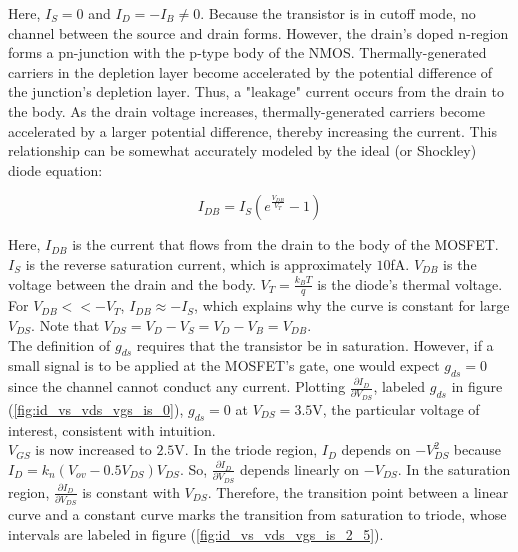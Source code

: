 \FloatBarrier

Here, $I_{S} = 0$ and $I_{D} = -I_{B} \neq 0$.
Because the transistor is in cutoff mode, no channel between the source and drain forms.
However, the drain's doped n-region forms a pn-junction with the p-type body of the NMOS.
Thermally-generated carriers in the depletion layer become accelerated by the potential difference of the junction's depletion layer.
Thus, a "leakage" current occurs from the drain to the body.
As the drain voltage increases, thermally-generated carriers become accelerated by a larger potential difference, thereby increasing the current.
This relationship can be somewhat accurately modeled by the ideal (or Shockley) diode equation:

\begin{equation}
	\label{eq:shockley_diode}
	I_{DB} = I_{S} ( e^{ \frac{ V_{DB} }{ V_{T} } } - 1 )
\end{equation}

Here, $I_{DB}$ is the current that flows from the drain to the body of the MOSFET.
$I_{S}$ is the reverse saturation current, which is approximately $10$\si{\femto\ampere}.
$V_{DB}$ is the voltage between the drain and the body.
$V_{T} = \frac{ k_{B} T }{ q }$ is the diode's thermal voltage.
For $V_{DB} << -V_{T}$, $I_{DB} \approx -I_{S}$, which explains why the curve is constant for large $V_{DS}$.
Note that $V_{DS} = V_{D} - V_{S} = V_{D} - V_{B} = V_{DB}$. \\

The definition of $g_{ds}$ requires that the transistor be in saturation.
However, if a small signal is to be applied at the MOSFET's gate, one would expect $g_{ds} = 0$ since the channel cannot conduct any current.
Plotting $\frac{ \partial I_{D} }{ \partial V_{DS} }$, labeled $g_{ds}$ in figure (\ref{fig:id_vs_vds_vgs_is_0}), $g_{ds} = 0$ at $V_{DS} = 3.5$\si{\volt}, the particular voltage of interest, consistent with intuition. \\

$V_{GS}$ is now increased to $2.5\si{\volt}$.
In the triode region, $I_{D}$ depends on $-V_{DS}^{2}$ because $I_{D} = k_{n} ( V_{ov} - 0.5 V_{DS} ) V_{DS}$.
So, $\frac{ \partial I_{D} }{ \partial V_{DS} }$ depends linearly on $-V_{DS}$.
In the saturation region, $\frac{ \partial I_{D} }{ \partial V_{DS} }$ is constant with $V_{DS}$.
Therefore, the transition point between a linear curve and a constant curve marks the transition from saturation to triode, whose intervals are labeled in figure (\ref{fig:id_vs_vds_vgs_is_2_5}).

